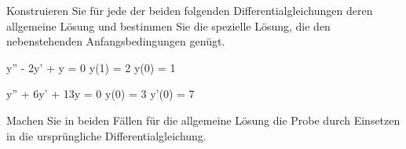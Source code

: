 \begin{atiTask}[
	title = Die charakteristische Gleichung,
	topic = Gewöhnliche Differentialgleichungen,
	subtopic = Die lineare homogene Differentialgleichung 2. Ordnung mit konstanten Koeffizienten,
	language = Deutsch,
]
	Konstruieren Sie für jede der beiden folgenden Differentialgleichungen deren allgemeine Lösung und bestimmen Sie die spezielle Lösung, die den nebenstehenden Anfangsbedingungen genügt.
	\begin{atiSubequations}
		\item{
			y'' - 2y' + y = 0 \separate y(1) = 2 \separate y(0) = 1
		}
		\item{
			y'' + 6y' + 13y = 0 \separate y(0) = 3 \separate y'(0) = 7
		}
	\end{atiSubequations}
	Machen Sie in beiden Fällen für die allgemeine Lösung die Probe durch Einsetzen in die ursprüngliche Differentialgleichung.
\end{atiTask}